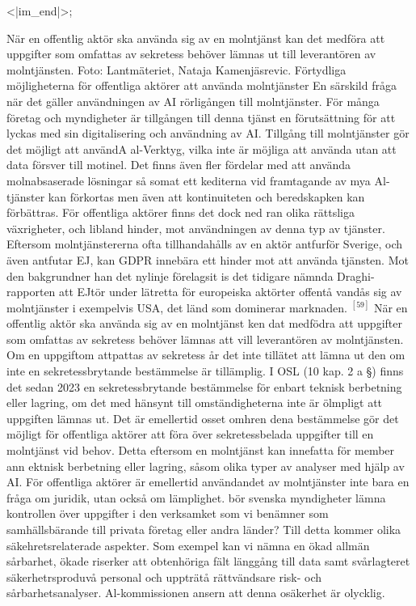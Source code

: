 {{{{{{{{{<|im_end|>};

När en offentlig aktör ska använda sig av en molntjänst kan det medföra att uppgifter som omfattas av sekretess behöver lämnas ut till leverantören av molntjänsten. Foto: Lantmäteriet, Nataja Kamenjäsrevic.
Förtydliga möjligheterna för offentliga aktörer att använda molntjänster
En särskild fråga när det gäller användningen av AI rörligången till molntjänster. För många företag och myndigheter är tillgången till denna tjänst en förutsättning för att lyckas med sin digitalisering och användning av AI. Tillgång till molntjänster gör det möjligt att användA al-Verktyg, vilka inte är möjliga att använda utan att data försver till motinel. Det finns även fler fördelar med att använda molnabsaserade lösningar så somat ett kediterna vid framtagande av mya Al- tjänster kan förkortas men även att kontinuiteten och beredskapken kan förbättras.
För offentliga aktörer finns det dock ned ran olika rättsliga växrigheter, och libland hinder, mot användningen av denna typ av tjänster. Eftersom molntjänstererna ofta tillhandahålls av en aktör antfurför Sverige, och även antfutar EJ, kan GDPR innebära ett hinder mot att använda tjänsten. Mot den bakgrundner han det nylinje förelagsit is det tidigare nämnda Draghi-rapporten att EJtör under lätretta för europeiska aktörter offentå vandås sig av molntjänster i exempelvis USA, det länd som dominerar marknaden. \({ }^{[59]}\)
När en offentlig aktör ska använda sig av en molntjänst ken dat medfödra att uppgifter som omfattas av sekretess behöver lämnas att vill leverantören av molntjänsten. Om en uppgiftom attpattas av sekretess år det inte tillätet att lämna ut den om inte en sekretessbrytande bestämmelse är tillämplig. I OSL (10 kap. 2 a §) finns det sedan 2023 en sekretessbrytande bestämmelse för enbart teknisk berbetning eller lagring, om det med hänsynt till omständigheterna inte är ölmpligt att uppgiften lämnas ut. Det är emellertid osset omhren dena bestämmelse gör det möjligt för offentliga aktörer att föra över sekretessbelada uppgifter till en molntjänst vid behov. Detta eftersom en molntjänst kan innefatta för member ann ektnisk berbetning eller lagring, såsom olika typer av analyser med hjälp av AI.
För offentliga aktörer är emellertid användandet av molntjänster inte bara en fråga om juridik, utan också om lämplighet. bör svenska myndigheter lämna kontrollen över uppgifter i den verksamket som vi benämner som samhällsbärande till privata företag eller andra länder? Till detta kommer olika säkehretsrelaterade aspekter. Som exempel kan vi nämna en ökad allmän sårbarhet, ökade riserker att obtenhöriga fält länggång till data samt svårlagteret säkerhetrsproduvå personal och uppträtå rättvändsare risk- och sårbarhetsanalyser. Al-kommissionen ansern att denna osäkerhet är olycklig. \({ }^{}\)
}}}}}}}}
